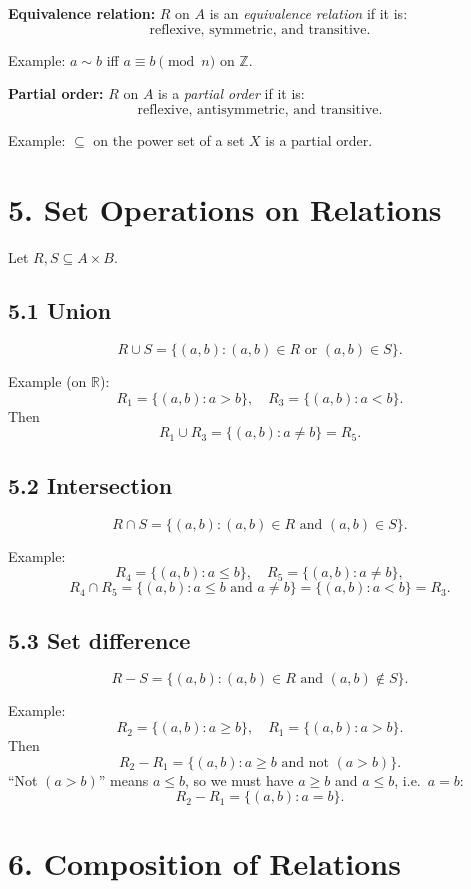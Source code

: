 \documentclass[11pt]{article}
\begin{document}
\textbf{Equivalence relation:} $R$ on $A$ is an \emph{equivalence relation} if it is:
\[
\text{reflexive, symmetric, and transitive}.
\]

Example: $a\sim b$ iff $a\equiv b\pmod{n}$ on $\mathbb{Z}$.

\medskip
\textbf{Partial order:} $R$ on $A$ is a \emph{partial order} if it is:
\[
\text{reflexive, antisymmetric, and transitive}.
\]

Example: $\subseteq$ on the power set of a set $X$ is a partial order.

\section*{5. Set Operations on Relations}

Let $R,S\subseteq A\times B$.

\subsection*{5.1 Union}

\[
R\cup S = \{(a,b): (a,b)\in R \text{ or } (a,b)\in S\}.
\]

Example (on $\mathbb{R}$):
\[
R_1 = \{(a,b): a>b\},\quad R_3 = \{(a,b): a<b\}.
\]
Then
\[
R_1\cup R_3 = \{(a,b): a\neq b\} = R_5.
\]

\subsection*{5.2 Intersection}

\[
R\cap S = \{(a,b): (a,b)\in R \text{ and } (a,b)\in S\}.
\]

Example:
\[
R_4 = \{(a,b): a\le b\},\quad R_5 = \{(a,b): a\neq b\},
\]
\[
R_4\cap R_5 = \{(a,b): a\le b \text{ and } a\neq b\} = \{(a,b): a<b\} = R_3.
\]

\subsection*{5.3 Set difference}

\[
R - S = \{(a,b): (a,b)\in R \text{ and } (a,b)\notin S\}.
\]

Example:
\[
R_2 = \{(a,b): a\ge b\},\quad R_1 = \{(a,b): a>b\}.
\]
Then
\[
R_2 - R_1 = \{(a,b): a\ge b \text{ and not }(a>b)\}.
\]
``Not $(a>b)$'' means $a\le b$, so we must have $a\ge b$ and $a\le b$, i.e.\ $a=b$:
\[
R_2 - R_1 = \{(a,b): a=b\}.
\]

\section*{6. Composition of Relations}
\end{document}

